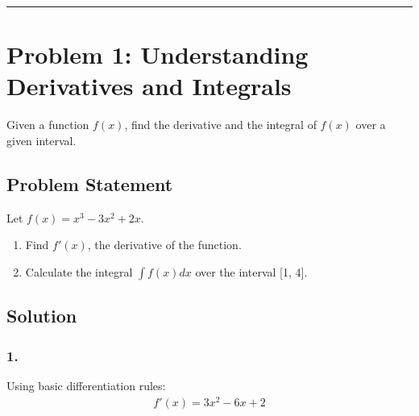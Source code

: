 \documentclass[letterpaper,10pt,english]{jupyterBook}
\begin{document}
\bigskip\hrule\bigskip



\section{Problem 1: Understanding Derivatives and Integrals}
\label{\detokenize{prerequisites:problem-1-understanding-derivatives-and-integrals}}
\sphinxAtStartPar
Given a function \(f(x)\), find the derivative and the integral of \(f(x)\) over a given interval.


\subsection{Problem Statement}
\label{\detokenize{prerequisites:problem-statement}}
\sphinxAtStartPar
Let \(f(x) = x^3 - 3x^2 + 2x\).
\begin{enumerate}
%
\item {} 
\sphinxAtStartPar
Find \(f'(x)\), the derivative of the function.

\item {} 
\sphinxAtStartPar
Calculate the integral \(\int f(x) dx\) over the interval {[}1, 4{]}.

\end{enumerate}


\subsection{Solution}
\label{\detokenize{prerequisites:solution}}

\subsubsection{1. }
\label{\detokenize{prerequisites:derivative}}
\sphinxAtStartPar
Using basic differentiation rules:
\begin{equation*}
\begin{split}
f'(x) = 3x^2 - 6x + 2
\end{split}
\end{equation*}
\end{document}
